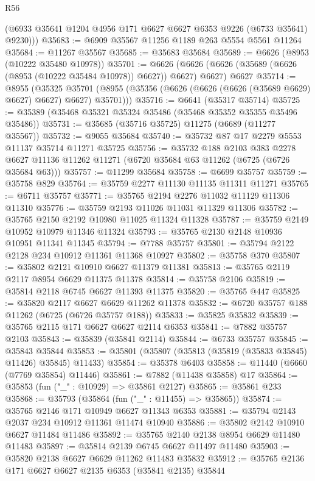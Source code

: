 \begin{lexlean}{R56}
\begin{coremodule}
        (@6933 @35641 @1204 @4956 @171 @6627 @6627 @6353 @9226 (@6733 @35641) @9230)))
@35683 := @6909 @35567 @11256 @1189 @263 @5554 @5561 @11264
@35684 := @11267 @35567
@35685 := @35683 @35684
@35689 := @6626 (@8953 (@10222 @35480 @10978))
@35701 := @6626
    (@6626 (@6626 (@35689 (@6626 (@8953 (@10222 @35484 @10978)) @6627)) @6627) @6627)
    @6627
@35714 := @8955
    (@35325 @35701 (@8955 (@35356 (@6626 (@6626 (@6626 (@35689 @6629) @6627) @6627) @6627) @35701)))
@35716 := @6641 (@35317 @35714)
@35725 := @35389 (@35468 @35321 @35324 @35486 (@35468 @35352 @35355 @35496 @35486))
@35731 := @35685 (@35716 @35725) @11275 (@6689 (@11277 @35567))
@35732 := @9055 @35684
@35740 := @35732 @87 @17 @2279 @5553 @11137 @35714 @11271 @35725
@35756 := @35732
    @188
    @2103
    @383
    @2278
    @6627
    @11136
    @11262
    @11271
    (@6720 @35684 @63 @11262 (@6725 (@6726 @35684 @63)))
@35757 := @11299 @35684
@35758 := @6699 @35757
@35759 := @35758 @829
@35764 := @35759 @2277 @11130 @11135 @11311 @11271
@35765 := @6711 @35757
@35771 := @35765 @2194 @2276 @11032 @11129 @11306 @11310
@35776 := @35759 @2193 @11026 @11031 @11329 @11306
@35782 := @35765 @2150 @2192 @10980 @11025 @11324 @11328
@35787 := @35759 @2149 @10952 @10979 @11346 @11324
@35793 := @35765 @2130 @2148 @10936 @10951 @11341 @11345
@35794 := @7788 @35757
@35801 := @35794 @2122 @2128 @234 @10912 @11361 @11368 @10927
@35802 := @35758 @370
@35807 := @35802 @2121 @10910 @6627 @11379 @11381
@35813 := @35765 @2119 @2117 @8954 @6629 @11375 @11378
@35814 := @35758 @2106
@35819 := @35814 @2118 @6745 @6627 @11393 @11375
@35820 := @35765 @447
@35825 := @35820 @2117 @6627 @6629 @11262 @11378
@35832 := @6720 @35757 @188 @11262 (@6725 (@6726 @35757 @188))
@35833 := @35825 @35832
@35839 := @35765 @2115 @171 @6627 @6627 @2114 @6353
@35841 := @7882 @35757 @2103
@35843 := @35839 (@35841 @2114)
@35844 := @6733 @35757
@35845 := @35843 @35844
@35853 := @35801 (@35807 (@35813 (@35819 (@35833 @35845) @11426) @35845) @11433)
@35854 := @35378 @6403
@35858 := @11440 (@6660 (@7769 @35854) @11446)
@35861 := @7882 (@11438 @35858) @17
@35864 := @35853 (fun ("_" : @10929) => @35861 @2127)
@35865 := @35861 @233
@35868 := @35793 (@35864 (fun ("_" : @11455) => @35865))
@35874 := @35765 @2146 @171 @10949 @6627 @11343 @6353
@35881 := @35794 @2143 @2037 @234 @10912 @11361 @11474 @10940
@35886 := @35802 @2142 @10910 @6627 @11484 @11486
@35892 := @35765 @2140 @2138 @8954 @6629 @11480 @11483
@35897 := @35814 @2139 @6745 @6627 @11497 @11480
@35903 := @35820 @2138 @6627 @6629 @11262 @11483 @35832
@35912 := @35765 @2136 @171 @6627 @6627 @2135 @6353 (@35841 @2135) @35844

\end{coremodule}
\end{lexlean}
